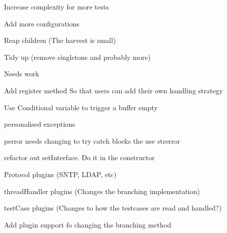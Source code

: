 
\begin{DoxyRefList}
\item[Module \mbox{\hyperlink{group__HelloGoodByeServer}{Hello\+Good\+Bye\+Server}} ]\label{todo__todo000001}%
%
Increase complexity for more tests 

Add more configurations 

Reap children (The harvest is small) 

Tidy up (remove singletons and probably more) 
\item[Member \mbox{\hyperlink{classhwProt_1_1HelloWorldProtocol_a2af49345e67a98301465ffb2743b6177}{hw\+Prot::Hello\+World\+Protocol::Get\+Data\+To\+Send}} () override]\label{todo__todo000002}%
%
Needs work  
\item[Module \mbox{\hyperlink{group__logger}{logger}} ]\label{todo__todo000011}%
%
Add register method So that users can add their own handling strategy  
\item[Member \mbox{\hyperlink{classLoggerClasses_1_1LogFile_a0b87592b5bbe3803b9c09e21351e4288}{Logger\+Classes::Log\+File::Write\+All\+Messages\+To\+Stream}} () override]\label{todo__todo000007}%
%
Use Conditional variable to trigger a buffer empty  
\item[Member \mbox{\hyperlink{classLoggerClasses_1_1LogHandler_ae6a51c1ec30e7aef116be8c906e8387f}{Logger\+Classes::Log\+Handler::Get\+Log\+File\+By\+Name}} (const std\+::string \&log\+Name) const override]\label{todo__todo000010}%
%
personalised exceptions  
\item[Module \mbox{\hyperlink{group__NetworkCommunication}{Network\+Communication}} ]\label{todo__todo000003}%
%
perror needs changing to try catch blocks the use strerror 

refactor out set\+Interface. Do it in the constructor  
\item[Module \mbox{\hyperlink{group__Plugin}{Plugin}} ]\label{todo__todo000013}%
%
Protocol plugins (S\+N\+TP, L\+D\+AP, etc) 

thread\+Handler plugins (Changes the branching implementation) 

test\+Case plugins (Changes to how the testcases are read and handled?)

\label{todo__todo000014}%
%
Add plugin support fo changing the branching method 


\end{DoxyRefList}
